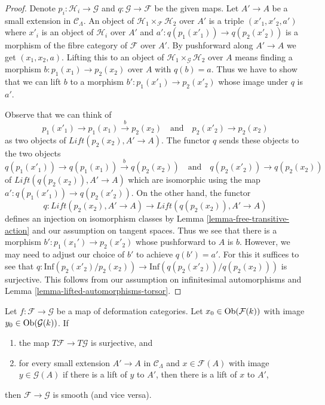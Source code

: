 \begin{proof}
Denote $p_i : \mathcal{H}_i \to \mathcal{G}$ and
$q : \mathcal{G} \to \mathcal{F}$ be the given maps.
Let $A' \to A$ be a small extension in $\mathcal{C}_\Lambda$.
An object of $\mathcal{H}_1 \times_\mathcal{F} \mathcal{H}_2$
over $A'$ is a triple $(x'_1, x'_2, a')$ where
$x'_i$ is an object of $\mathcal{H}_i$ over $A'$ and
$a' : q(p_1(x'_1)) \to q(p_2(x'_2))$ is a morphism
of the fibre category of $\mathcal{F}$ over $A'$.
By pushforward along $A' \to A$ we get
$(x_1, x_2, a)$. Lifting this to an object of
$\mathcal{H}_1 \times_\mathcal{G} \mathcal{H}_2$
over $A$ means finding a morphism
$b : p_1(x_1) \to p_2(x_2)$ over $A$ with $q(b) = a$.
Thus we have to show that we can lift $b$ to a morphism
$b' : p_1(x'_1) \to p_2(x'_2)$ whose image under $q$ is $a'$.

\medskip\noindent
Observe that we can think of
$$
p_1(x'_1) \to p_1(x_1) \xrightarrow{b} p_2(x_2)
\quad\text{and}\quad
p_2(x'_2) \to p_2(x_2)
$$
as two objects of $\textit{Lift}(p_2(x_2), A' \to A)$.
The functor $q$ sends these objects to the two objects
$$
q(p_1(x'_1)) \to q(p_1(x_1)) \xrightarrow{b} q(p_2(x_2))
\quad\text{and}\quad
q(p_2(x'_2)) \to q(p_2(x_2))
$$
of $\textit{Lift}(q(p_2(x_2)), A' \to A)$
which are isomorphic using the map $a' : q(p_1(x'_1)) \to q(p_2(x'_2))$.
On the other hand, the functor
$$
q : \textit{Lift}(p_2(x_2), A' \to A) \to
\textit{Lift}(q(p_2(x_2)), A' \to A)
$$
defines an injection on isomorphism classes by
Lemma \ref{lemma-free-transitive-action}
and our assumption on tangent spaces. Thus we see that there is a morphism
$b' : p_1(x_1') \to p_2(x'_2)$ whose pushforward to $A$ is $b$.
However, we may need to adjust our choice of $b'$
to achieve $q(b') = a'$. For this it suffices to see that
$q : \text{Inf}(p_2(x'_2)/p_2(x_2)) \to \text{Inf}(q(p_2(x'_2))/q(p_2(x_2)))$
is surjective. This follows from our assumption on
infinitesimal automorphisms and Lemma \ref{lemma-lifted-automorphisms-torsor}.
\end{proof}

\begin{lemma}
\label{lemma-easy-check-smooth}
Let $f : \mathcal{F} \to \mathcal{G}$ be a map of deformation
categories. Let $x_0 \in \mathop{\mathrm{Ob}}\nolimits(\mathcal{F}(k))$ with image
$y_0 \in \mathop{\mathrm{Ob}}\nolimits(\mathcal{G}(k))$. If
\begin{enumerate}
\item the map $T\mathcal{F} \to T\mathcal{G}$ is surjective, and
\item for every small extension $A' \to A$ in $\mathcal{C}_\Lambda$
and $x \in \mathcal{F}(A)$ with image $y \in \mathcal{G}(A)$
if there is a lift of $y$ to $A'$, then there is a lift
of $x$ to $A'$,
\end{enumerate}
then $\mathcal{F} \to \mathcal{G}$ is smooth (and vice versa).
\end{lemma}

